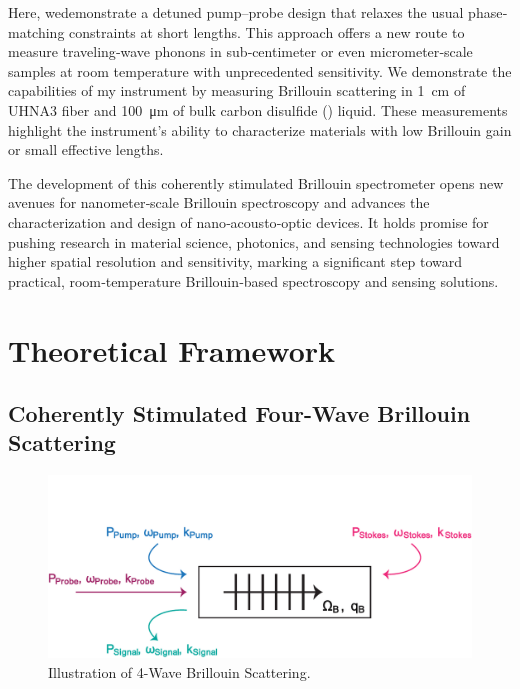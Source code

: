Here, wedemonstrate a detuned pump–probe design that relaxes the usual phase‐matching constraints at short lengths. This approach offers a new route to measure traveling‐wave phonons in sub‐centimeter or even micrometer‐scale samples at room temperature with unprecedented sensitivity. We demonstrate the capabilities of my instrument by measuring Brillouin scattering in \SI{1}{\centi\meter} of \ac{UHNA3} fiber and \SI{100}{\micro\meter} of bulk carbon disulfide () liquid. These measurements highlight the instrument’s ability to characterize materials with low Brillouin gain or small effective lengths.

The development of this coherently stimulated Brillouin spectrometer opens new avenues for nanometer‐scale Brillouin spectroscopy and advances the characterization and design of nano‐acousto‐optic devices. It holds promise for pushing research in material science, photonics, and sensing technologies toward higher spatial resolution and sensitivity, marking a significant step toward practical, room‐temperature Brillouin‐based spectroscopy and sensing solutions.

\section{Theoretical Framework}
\label{Theoretical Framework}

\subsection{Coherently Stimulated Four-Wave Brillouin Scattering}
\label{Theoretical Framework:Coherently stimulated five-wave Brillouin scattering}

\begin{figure}[t]
  \centering
  \includegraphics[width=\textwidth]{figs/4-CoBS/4-Wave-Brillouin-Scattering.pdf}
  \caption{Illustration of 4-Wave Brillouin Scattering.}
  \label{fig:4-Wave-Brillouin-Scattering}
\end{figure}

